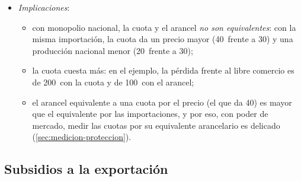 \documentclass[11pt]{article}
\begin{document}
\begin{itemize}
\item \emph{Implicaciones}:
  \begin{itemize}
  \item con monopolio nacional, la cuota y el arancel \emph{no son equivalentes}: con la misma importación, la cuota da un precio mayor (40~frente a 30) y una producción nacional menor (20~frente a 30);
  \item la cuota cuesta más: en el ejemplo, la pérdida frente al libre comercio es de 200~con la cuota y de 100~con el arancel;
  \item el arancel equivalente a una cuota por el precio (el que da 40) es mayor que el equivalente por las importaciones, y por eso, con poder de mercado, medir las cuotas por su equivalente arancelario es delicado (\ref{sec:medicion-proteccion}).
  \end{itemize}
\end{itemize}

\subsection{Subsidios a la exportación}\label{sec:subvenciones}
\end{document}
